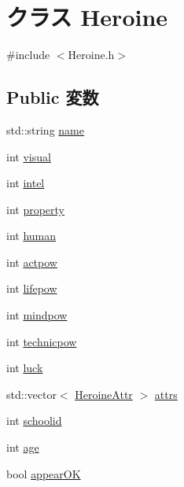 \hypertarget{class_heroine}{\section{クラス Heroine}
\label{class_heroine}
}


{\ttfamily \#include $<$Heroine.\-h$>$}

\subsection*{Public 変数}
\begin{DoxyCompactItemize}
\item 
std\-::string \hyperlink{class_heroine_a0ab7a4e9b216f96c5e8e8248af55e71a}{name}
\item 
int \hyperlink{class_heroine_a2e514d4fc23f767db26d784c68b873aa}{visual}
\item 
int \hyperlink{class_heroine_a085a99674b147d11ea0485dd92ff015e}{intel}
\item 
int \hyperlink{class_heroine_a17ef1aa15d58ef8eed9a319d59ee270f}{property}
\item 
int \hyperlink{class_heroine_a0fa65600a12799447189c09a0bee7b3e}{human}
\item 
int \hyperlink{class_heroine_ac61fab4be574f24f4acba98ffb378659}{actpow}
\item 
int \hyperlink{class_heroine_ae345b69491b13d0ff434fd9660e6d512}{lifepow}
\item 
int \hyperlink{class_heroine_a8d7c5cbfa1d9fafef76104f66af22f9c}{mindpow}
\item 
int \hyperlink{class_heroine_a7456ab0e6a903a4463791122bd3f2d77}{technicpow}
\item 
int \hyperlink{class_heroine_a23fc3ab3592baaac8b2a4bd3a8e35d01}{luck}
\item 
std\-::vector$<$ \hyperlink{class_heroine_attr}{Heroine\-Attr} $>$ \hyperlink{class_heroine_a9ffecfedbbc121692855ca1549cfe4b5}{attrs}
\item 
int \hyperlink{class_heroine_a36a37961c5006658137fe5e7de17282a}{schoolid}
\item 
int \hyperlink{class_heroine_ae4b64050de16a8057995ad6dc16ebcad}{age}
\item 
bool \hyperlink{class_heroine_a076bc8f1ba22d3214059214b6f94b255}{appear\-O\-K}
\end{DoxyCompactItemize}


